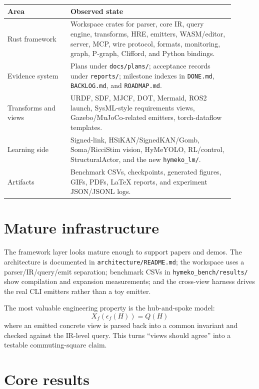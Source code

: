 \documentclass[11pt]{article}
\newcommand{\pathref}[1]{\nolinkurl{#1}}
\begin{document}
\begin{table}[h]\centering\small
\begin{tabular}{p{0.25\linewidth}p{0.65\linewidth}}
\toprule
Area & Observed state \\
\midrule
Rust framework & Workspace crates for parser, core IR, query engine, transforms, HRE,
emitters, WASM/editor, server, MCP, wire protocol, formats, monitoring, graph,
P-graph, Clifford, and Python bindings. \\
Evidence system & Plans under \pathref{docs/plans/}; acceptance records under
\pathref{reports/}; milestone indexes in \pathref{DONE.md}, \pathref{BACKLOG.md},
and \pathref{ROADMAP.md}. \\
Transforms and views & URDF, SDF, MJCF, DOT, Mermaid, ROS2 launch, SysML-style
requirements views, Gazebo/MuJoCo-related emitters, torch-dataflow templates. \\
Learning side & Signed-link, HSiKAN/SignedKAN/Gomb, Soma/RicciStim vision,
HyMeYOLO, RL/control, StructuralActor, and the new \pathref{hymeko_lm/}. \\
Artifacts & Benchmark CSVs, checkpoints, generated figures, GIFs, PDFs, LaTeX
reports, and experiment JSON/JSONL logs. \\
\bottomrule
\end{tabular}
\end{table}

\section{Mature infrastructure}

The framework layer looks mature enough to support papers and demos. The
architecture is documented in \pathref{architecture/README.md}; the workspace
uses a parser/IR/query/emit separation; benchmark CSVs in
\pathref{hymeko_bench/results/} show compilation and expansion measurements;
and the cross-view harness drives the real CLI emitters rather than a toy
emitter.

The most valuable engineering property is the hub-and-spoke model:
\[
  X_f(\epsilon_f(H)) = Q(H)
\]
where an emitted concrete view is parsed back into a common invariant and
checked against the IR-level query. This turns ``views should agree'' into a
testable commuting-square claim.

\section{Core results}
\end{document}
